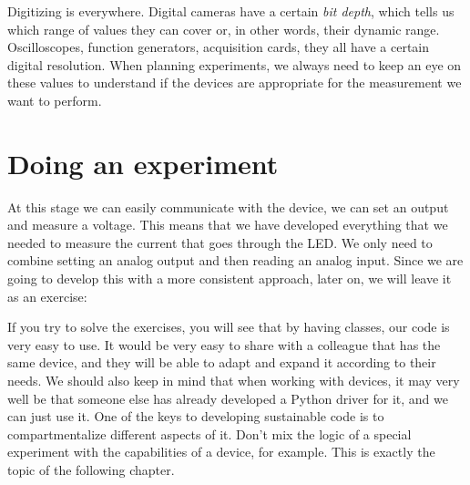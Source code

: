 Digitizing is everywhere. Digital cameras have a certain \emph{bit depth}, which tells us which range of values they can cover or, in other words, their dynamic range. Oscilloscopes, function generators, acquisition cards, they all have a certain digital resolution. When planning experiments, we always need to keep an eye on these values to understand if the devices are appropriate for the measurement we want to perform. 


\section{Doing an experiment}
At this stage we can easily communicate with the device, we can set an output and measure a voltage. This means that we have developed everything that we needed to measure the current that goes through the LED. We only need to combine setting an analog output and then reading an analog input. Since we are going to develop this with a more consistent approach, later on, we will leave it as an exercise:




If you try to solve the exercises, you will see that by having classes, our code is very easy to use. It would be very easy to share with a colleague that has the same device, and they will be able to adapt and expand it according to their needs. We should also keep in mind that when working with devices, it may very well be that someone else has already developed a Python driver for it, and we can just use it. One of the keys to developing sustainable code is to compartmentalize different aspects of it. Don't mix the logic of a special experiment with the capabilities of a device, for example. This is exactly the topic of the following chapter. 

